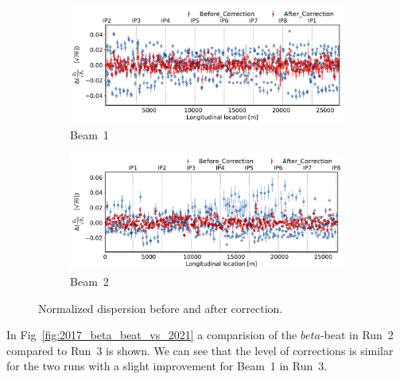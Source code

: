 \documentclass[a4paper]{cernatsnote}
\begin{document}
\begin{figure}[ht]
\begin{subfigure}{.5\textwidth}
  \centering
  \includegraphics[width=.8\linewidth]{plots/beam1/Normalized_disp_before_vs_after_corection.pdf}  
  \caption{Beam~1}
\end{subfigure}
\begin{subfigure}{.5\textwidth}
  \centering
  \includegraphics[width=.8\linewidth]{plots/beam2/ndisp_before_after_correction.pdf}  
  \caption{Beam~2}
\end{subfigure}
\caption{Normalized dispersion before and after correction.}
\label{fig:before_after_correction_beta_beat}
\end{figure}


In Fig~\ref{fig:2017_beta_beat_vs_2021} a comparision of the $beta$-beat in Run~2 compared to Run~3 is shown. We can see that the level of corrections is similar for the two runs with a slight improvement for Beam~1 in Run~3. 
\end{document}
